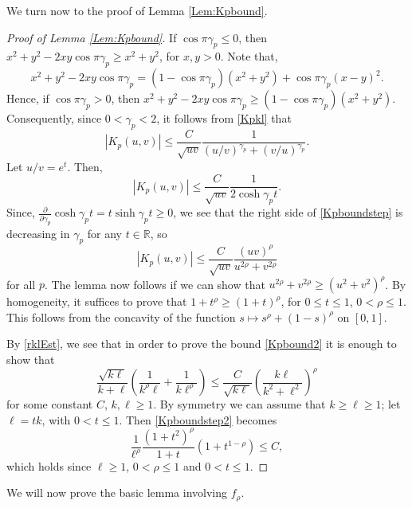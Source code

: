\documentclass{article}
\numberwithin{equation}{section}
\numberwithin{figure}{section}
\theoremstyle{plain}
\theoremstyle{plain}
\numberwithin{thm}{section}
\theoremstyle{remark}
\newcommand{\R}{\mathbb{R}}
\let \le \leqslant
\let \ge \geqslant
\begin{document}
We turn now to the proof of Lemma \ref{Lem:Kpbound}.
\begin{proof}[Proof of Lemma \ref{Lem:Kpbound}]
If $\cos\pi\gamma_p\le 0$, then $x^2+y^2-2xy\cos\pi\gamma_p\ge x^2+y^2$, for $x,y>0$.
Note that, 
\begin{equation*}
x^2+y^2-2xy\cos\pi\gamma_p=(1-\cos\pi\gamma_p)(x^2+y^2)+\cos\pi\gamma_p(x-y)^2.
\end{equation*}
Hence, if $\cos\pi\gamma_p>0$, then $x^2+y^2-2xy\cos\pi\gamma_p\ge(1-\cos\pi\gamma_p)(x^2+y^2)$. Consequently, since $0<\gamma_p<2$, it follows from \eqref{Kpkl} that
\begin{equation*}
|K_p(u,v)|\le\frac C{\sqrt{uv}}\frac 1{(u/v)^{\gamma_p}+(v/u)^{\gamma_p}}.
\end{equation*}
Let $u/v=e^t$. Then,
\begin{equation}\label{Kpboundstep}
|K_p(u,v)|\le\frac C{\sqrt{uv}}\frac 1{2\cosh\gamma_pt}.
\end{equation}
Since, $\frac{\partial}{\partial\gamma_p}\cosh\gamma_pt=t\sinh\gamma_pt\ge 0$, we see that the right side of \eqref{Kpboundstep} is decreasing in $\gamma_p$ for
any $t\in\R$, so
\begin{equation*}
|K_p(u,v)|\le\frac C{\sqrt{uv}}\frac{(uv)^\rho}{u^{2\rho}+v^{2\rho}}
\end{equation*}
for all $p$.
The lemma now follows if we can show that $u^{2\rho}+v^{2\rho}\ge (u^2+v^2)^\rho$. By homogeneity, it suffices to prove that $1+t^\rho\ge (1+t)^\rho$, 
for $0\le t\le 1$, $0<\rho\le 1$. This follows from the concavity of the function $s\mapsto s^\rho+(1-s)^\rho$ on $[0,1]$.

By \eqref{rklEst}, we see that in order to prove the bound \eqref{Kpbound2} it is enough to show that
\begin{equation}\label{Kpboundstep2}
\frac{\sqrt{k\ell}}{k+\ell}\left(\frac 1{k^\rho\ell}+\frac 1{k\ell^\rho}\right)\le \frac C{\sqrt{k\ell}}\left(\frac{k\ell}{k^2+\ell^2}\right)^\rho
\end{equation}
for some constant $C$, $k,\ell\ge 1$. By symmetry we can assume that $k\ge \ell\ge 1$; let $\ell=tk$, with $0<t\le 1$. Then \eqref{Kpboundstep2} becomes
\begin{equation*}
\frac 1{\ell^\rho}\frac{(1+t^2)^\rho}{1+t}(1+t^{1-\rho})\le C,
\end{equation*}
which holds since $\ell\ge 1$, $0<\rho\le 1$ and $0<t\le 1$.
\end{proof}

We will now prove the basic lemma involving $f_\rho$.
\end{document}
